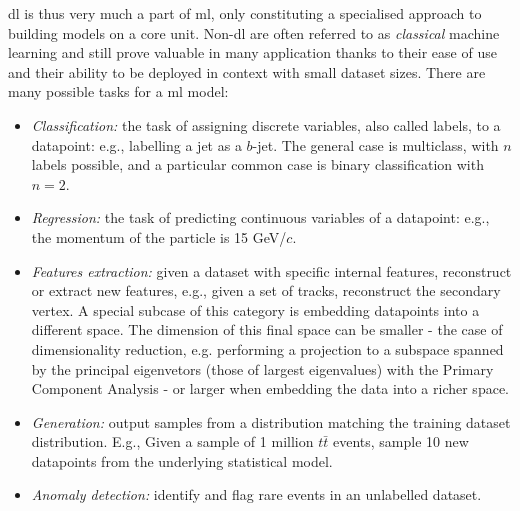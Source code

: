 \gls{dl} is thus very much a part of \gls{ml}, only constituting a specialised approach to building models on a core unit. Non-\gls{dl} are often referred to as \textit{classical} machine learning and still prove valuable in many application thanks to their ease of use and their ability to be deployed in context with small dataset sizes. There are many possible tasks for a \gls{ml} model: 
\begin{itemize}
    \item \textit{Classification:} the task of assigning discrete variables, also called labels, to a datapoint: e.g., labelling a jet as a $b$-jet. The general case is multiclass, with $n$ labels possible, and a particular common case is binary classification with $n = 2$.
    \item \textit{Regression:} the task of predicting continuous variables of a datapoint: e.g., the momentum of the particle is 15 GeV/$c$. 
    \item \textit{Features extraction:} given a dataset with specific internal features, reconstruct or extract new features, e.g., given a set of tracks, reconstruct the secondary vertex. A special subcase of this category is embedding datapoints into a different space. The dimension of this final space can be smaller - the case of dimensionality reduction, e.g. performing a projection to a subspace spanned by the principal eigenvetors (those of largest eigenvalues) with the Primary Component Analysis - or larger when embedding the data into a richer space. 
    \item \textit{Generation:} output samples from a distribution matching the training dataset distribution. E.g., Given a sample of 1 million $t\bar{t}$ events, sample 10 new datapoints from the underlying statistical model. 
    \item \textit{Anomaly detection:} identify and flag rare events in an unlabelled dataset.
\end{itemize}

